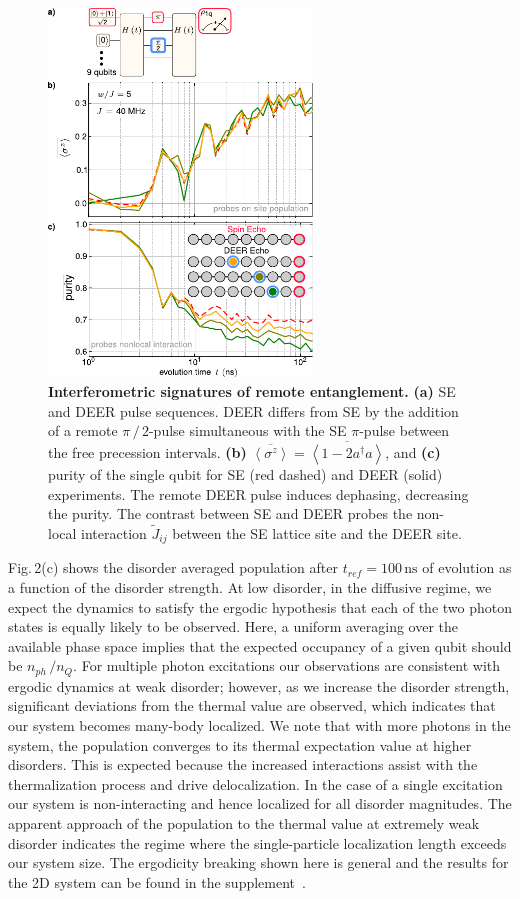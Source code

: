 \begin{figure}[t]
\centering
\includegraphics[width=70mm]{./PDF/fig_3.pdf}
\caption{
\textbf{Interferometric signatures of remote entanglement.}
\textbf{(a)} SE and DEER pulse sequences. DEER differs from SE by the addition of a remote $\pi\, /\,2$-pulse simultaneous with the SE $\pi$-pulse between the free precession intervals. \textbf{(b)}  $\overline{ \left< \sigma^z \right> } =\overline{ \left< 1 - 2 a^\dagger a \right> }$, and \textbf{(c)}  purity of the single qubit for SE (red dashed) and DEER (solid) experiments. The remote DEER pulse induces dephasing, decreasing the purity. The contrast between SE and DEER probes the non-local interaction $\widetilde{J}_{ij}$ between the SE lattice site and the DEER site.}
\end{figure}

Fig.\,2(c) shows the disorder averaged population after $t_{ref}=100\, \text{ns}$ of evolution as a function of the disorder strength. At low disorder, in the diffusive regime, we expect the dynamics to satisfy the ergodic hypothesis that each of the two photon states is equally likely to be observed. Here, a uniform averaging over the available phase space implies that the expected occupancy of a given qubit should be $n_{ph}\,/n_Q$. For multiple photon excitations our observations are consistent with ergodic dynamics at weak disorder; however, as we increase the disorder strength, significant deviations from the thermal value are observed, which indicates that our system becomes many-body localized. We note that with more photons in the system, the population converges to its thermal expectation value at higher disorders. This is expected because the increased interactions assist with the thermalization process and drive delocalization. In the case of a single excitation our system is non-interacting and hence localized for all disorder magnitudes. The apparent approach of the population to the thermal value at extremely weak disorder indicates the regime where the single-particle localization length exceeds our system size.  The ergodicity breaking shown here is general and the results for the 2D system can be found in the supplement\, \cite{supplement}.
